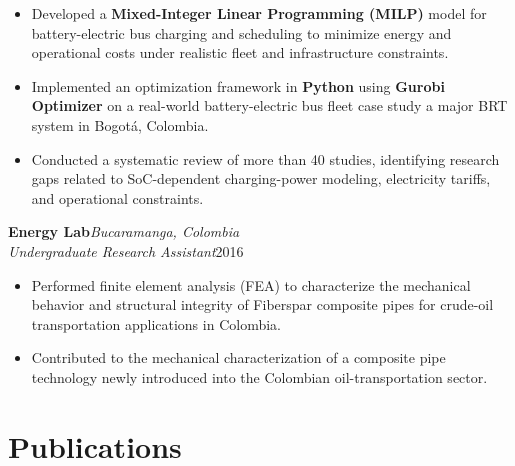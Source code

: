 \documentclass[11pt,a4paper]{article}
\newcommand{\cventry}[4]{%
	\noindent
	\textbf{#1}\hfill\textit{#2}\\
	\textit{#3}\hfill{#4}
	\par\vspace{1pt}
}
\begin{document}
	\begin{itemize}
		
		\item Developed a
		\textbf{Mixed-Integer Linear Programming (MILP)}
		model for battery-electric bus charging and scheduling
		to minimize energy and operational costs under realistic
		fleet and infrastructure constraints.
		
		\item Implemented an optimization framework
		in \textbf{Python} using \textbf{Gurobi Optimizer}
		on a real-world battery-electric bus fleet case study
		a major BRT system in Bogotá, Colombia.
		
		\item Conducted a systematic review of more than 40 studies,
		identifying research gaps related to
		SoC-dependent charging-power modeling,
		electricity tariffs,
		and operational constraints.
		
	\end{itemize}
	
	\vspace{4pt}
	
	\cventry
	{Energy Lab}
	{Bucaramanga, Colombia}
	{Undergraduate Research Assistant}
	{2016}
	
	\begin{itemize}
		
		\item Performed finite element analysis (FEA)
		to characterize the mechanical behavior and structural integrity
		of Fiberspar composite pipes for crude-oil transportation
		applications in Colombia.
		
		\item Contributed to the mechanical characterization of a
		composite pipe technology newly introduced into the Colombian
		oil-transportation sector.
		
	\end{itemize}
	
	
	
	\section{Publications}
	
	
\end{document}
